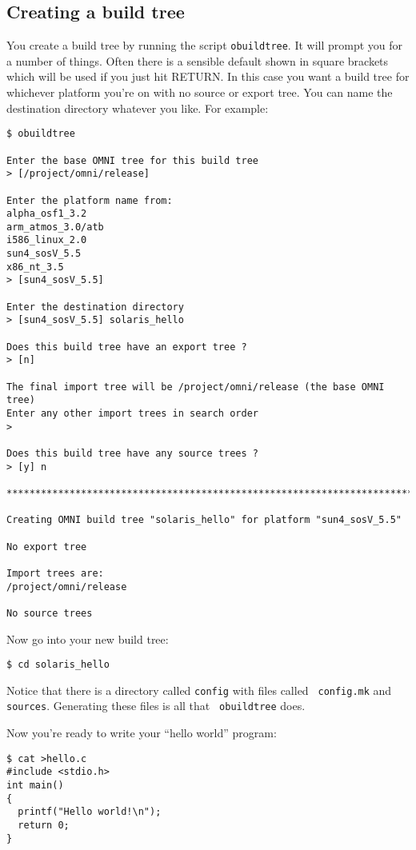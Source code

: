 \documentclass[11pt,twoside,onecolumn]{article}
\begin{document}
\subsection{Creating a build tree}

You create a build tree by running the script {\tt obuildtree}.  It will prompt
you for a number of things.  Often there is a sensible default shown in square
brackets which will be used if you just hit RETURN.  In this case you want a
build tree for whichever platform you're on with no source or export tree.  You
can name the destination directory whatever you like.  For example:

{\footnotesize \begin{verbatim}
$ obuildtree

Enter the base OMNI tree for this build tree
> [/project/omni/release] 

Enter the platform name from:
alpha_osf1_3.2
arm_atmos_3.0/atb
i586_linux_2.0
sun4_sosV_5.5
x86_nt_3.5
> [sun4_sosV_5.5] 

Enter the destination directory
> [sun4_sosV_5.5] solaris_hello

Does this build tree have an export tree ?
> [n] 

The final import tree will be /project/omni/release (the base OMNI tree)
Enter any other import trees in search order
> 

Does this build tree have any source trees ?
> [y] n

************************************************************************

Creating OMNI build tree "solaris_hello" for platform "sun4_sosV_5.5"

No export tree

Import trees are:
/project/omni/release

No source trees

\end{verbatim}}

Now go into your new build tree:

{\footnotesize \begin{verbatim}
$ cd solaris_hello
\end{verbatim}}

Notice that there is a directory called {\tt config} with files called {\tt
config.mk} and {\tt sources}.  Generating these files is all that {\tt
obuildtree} does.

Now you're ready to write your ``hello world'' program:

{\footnotesize \begin{verbatim}
$ cat >hello.c
#include <stdio.h>
int main()
{
  printf("Hello world!\n");
  return 0;
}
\end{verbatim}}
\end{document}
